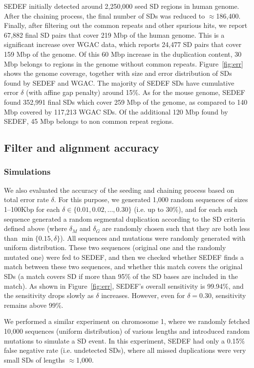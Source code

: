 \documentclass{article}
\begin{document}
SEDEF initially detected around 2,250,000 seed SD regions in human genome. After the chaining process, the final number of SDs was reduced to $\approx$186,400. Finally, after filtering out the common repeats and other spurious hits, we report 67,882 final SD pairs that cover 219 Mbp of the human genome. 
This is a significant increase over WGAC data, which reports 24,477 SD pairs that cover 159 Mbp of the genome. Of this 60 Mbp increase in the duplication content, 30 Mbp belongs to regions in the genome without common repeats. Figure~\ref{fig:err} shows the genome coverage, together with size and error distribution of SDs found by SEDEF and WGAC. The majority of SEDEF SDs have cumulative error $\delta$ (with affine gap penalty) around 15\%. 
As for the mouse genome, SEDEF found 352,991 final SDs which cover 259 Mbp of the genome, as compared to 140 Mbp covered by 117,213 WGAC SDs. Of the additional 120 Mbp found by SEDEF, 45 Mbp belongs to non common repeat regions.
       
\subsection{Filter and alignment accuracy}

\subsubsection{Simulations}
We also evaluated the accuracy of the seeding and chaining process based on total error rate $\delta$. For this purpose, we generated 1,000 random sequences of sizes 1--100Kbp for each $\delta \in \{0.01,0.02,\dots,0.30\}$ (i.e. up to 30\%), and for each such sequence generated a random segmental duplication according to the SD criteria defined above (where $\delta_M$ and $\delta_G$ are randomly chosen such that they are both less than $\min\{0.15,\delta\}$). All sequences and mutations were randomly generated with uniform distribution. These two sequences (original one and the randomly mutated one) were fed to SEDEF, and then we checked whether SEDEF finds a match between these two sequences, and whether this match covers the original SDs (a match covers SD if more than 95\% of the SD bases are included in the match).
As shown in Figure~\ref{fig:err}, SEDEF's overall sensitivity is 99.94\%, and the sensitivity drops slowly as $\delta$ increases. However, even for $\delta = 0.30$, sensitivity remains above 99\%.

We performed a similar experiment on chromosome 1, where we randomly fetched 10,000 sequences (uniform distribution) of various lengths and introduced random mutations to simulate a SD event. In this experiment, SEDEF had only a 0.15\% false negative rate (i.e. undetected SDs), where all missed duplications  were very small SDs of lengths $\approx$1,000.
\end{document}
